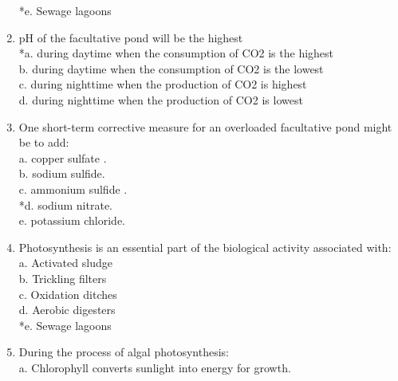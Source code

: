 \begin{enumerate}
*e. Sewage lagoons \\


\item  pH of the facultative pond will be the highest \\


*a. during daytime when the consumption of CO2 is the highest \\

b. during daytime when the consumption of CO2 is the lowest \\

c. during nighttime when the production of CO2 is highest \\

d. during nighttime when the production of CO2 is lowest \\


\item  One short-term corrective measure for an overloaded facultative pond might be to add: \\


a. copper sulfate . \\

b. sodium sulfide. \\

c. ammonium sulfide . \\

*d. sodium nitrate. \\

e. potassium chloride. \\


\item  Photosynthesis is an essential part of the biological activity associated with: \\


a. Activated sludge \\

b. Trickling filters \\

c. Oxidation ditches \\

d. Aerobic digesters \\

*e. Sewage lagoons \\


\item  During the process of algal photosynthesis: \\


a. Chlorophyll converts sunlight into energy for growth. \\


\end{enumerate}
